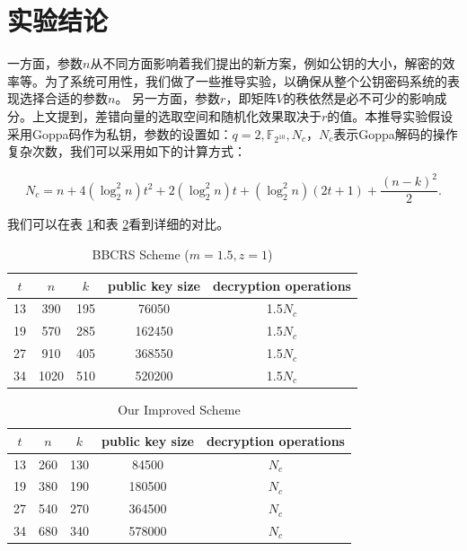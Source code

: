 \section{实验结论}
一方面，参数$n$从不同方面影响着我们提出的新方案，例如公钥的大小，解密的效率等。为了系统可用性，我们做了一些推导实验，以确保从整个公钥密码系统的表现选择合适的参数$n$。 另一方面，参数$r$，即矩阵$V$的秩依然是必不可少的影响成分。上文提到，差错向量的选取空间和随机化效果取决于$r$的值。本推导实验假设采用Goppa码作为私钥，参数的设置如：$q = 2, \mathbb{F}_{2^{10}}, N_c$，$N_c$表示Goppa解码的操作复杂次数，我们可以采用如下的计算方式：

\begin{equation}
	N_c=n+4(\log_2^2n)t^2+2(\log_2^2n)t+(\log_2^2n)(2t+1)+\frac{(n-k)^2}{2}.
\end{equation}

我们可以在表 \ref{bbcrsScheme}和表 \ref{ourScheme}看到详细的对比。

\begin{table}[h]
	\begin{center}
		\caption{BBCRS Scheme ($m=1.5,z=1$)}\label{bbcrsScheme}
		\begin{tabular}{ccccc}
			\hline
			$t$ & $n$& $k$ & public key size& decryption operations\\
			\hline
			13& 390& 195& 76050& 1.5$N_c$\\
			19& 570& 285& 162450& 1.5$N_c$\\
			27& 910& 405& 368550& 1.5$N_c$\\
			34& 1020& 510& 520200& 1.5$N_c$\\
			\hline
		\end{tabular}
	\end{center}
\end{table}

\begin{table}[h]
	\begin{center}
		\caption{Our Improved Scheme}\label{ourScheme}
		\begin{tabular}{ccccc}
			\hline
			$t$ & $n$& $k$ & public key size& decryption operations\\
			\hline
			13& 260& 130& 84500& $N_c$\\
			19& 380& 190& 180500& $N_c$\\
			27& 540& 270& 364500& $N_c$\\
			34& 680& 340& 578000& $N_c$\\
			\hline
		\end{tabular}
	\end{center}
\end{table}

